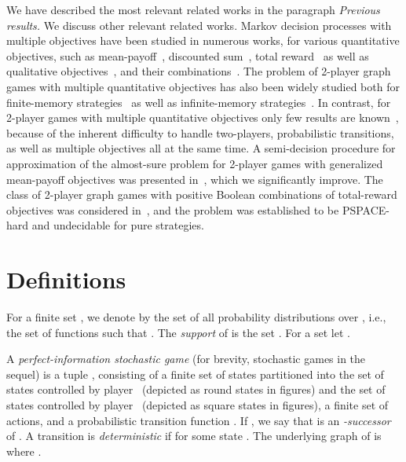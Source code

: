 \documentclass{article}
\newcommand{\half}{}
\begin{document}
\smallskip{} 
We have described the most relevant related works in the paragraph {\em Previous
results.} 
We discuss other relevant related works.
Markov decision processes with multiple objectives have been studied in numerous
works, for various quantitative objectives, such as mean-payoff~\cite{Cha07,BBCFK14}, 
discounted sum~\cite{CMH06,CFW13}, total reward~\cite{FKN11} as well as qualitative 
objectives~\cite{EKVY08}, and 
their combinations~\cite{CKK15,Baier-CSL-LICS-1,Baier-CSL-LICS-2,CR15}.
The problem of 2-player graph games with multiple quantitative objectives has 
also been widely studied both for finite-memory strategies~\cite{VCDHRR15,CRR14,JLS15,BR15,Vel14}
as well as infinite-memory strategies~\cite{VCDHRR15,CV13}.
In contrast, for 2\half-player games with multiple quantitative objectives only
few results are known~\cite{BKTW15,CFKSW13}, because of the inherent difficulty to handle two-players, probabilistic
transitions, as well as multiple objectives all at the same time.
A semi-decision procedure for approximation of the almost-sure problem for 2\half-player
games with generalized mean-payoff objectives was presented in~\cite{BKTW15}, 
which we significantly improve.
The class of 2\half-player graph games with positive Boolean combinations of total-reward
objectives was considered in~\cite{CFKSW13}, and the problem was established to be
PSPACE-hard and undecidable for pure strategies.










\section{Definitions}\label{sec:def}


For a finite set , we denote by  the set of all probability 
distributions over , i.e., the set of functions  
such that .
The \emph{support} of  is the set .
For a set  let .

\smallskip{}
A \emph{perfect-information stochastic game} (for brevity, stochastic games
in the sequel) 
is a tuple , 
consisting of a finite set  of states
partitioned into the set  of states controlled by player~ (depicted
as round states in figures) and the set  of states controlled by player~ (depicted
as square states in figures), a finite set  of actions, 
and a probabilistic transition function .
If , we say that  is an \emph{-successor} of .
A transition  is \emph{deterministic} if  for some 
state . 
The underlying graph of  is  where .
\end{document}
